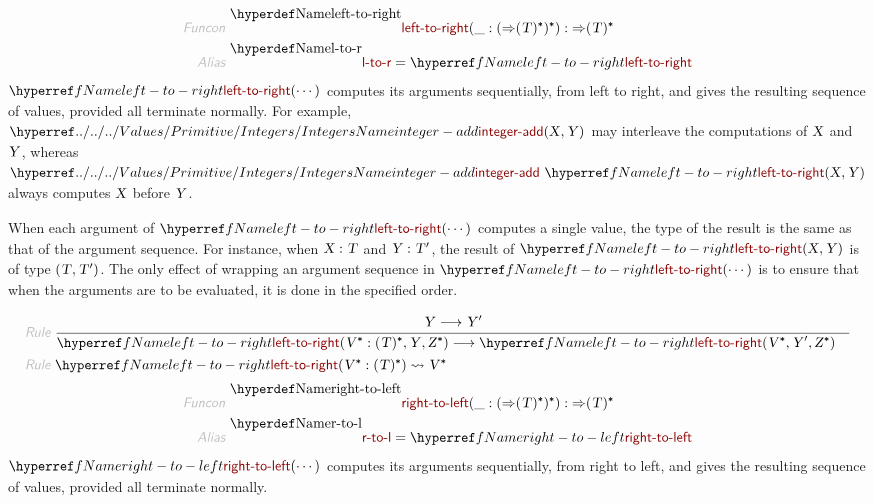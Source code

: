 \begin{align*}
  \KEY{Funcon} ~ 
  & \NAMEDECL{left-to-right}(\_ : (  \TO ( \VAR{T} )\STAR )\STAR) :  \TO ( \VAR{T} )\STAR
\\
  \KEY{Alias} ~ 
  & \NAMEDECL{l-to-r} = \NAMEREF{left-to-right}
\end{align*}
$\SHADE{\NAMEREF{left-to-right}
           ( \cdots )}$ computes its arguments sequentially, from left to right,
  and gives the resulting sequence of values, provided all terminate normally.
  For example, $\SHADE{\NAMEHYPER{../../../Values/Primitive}{Integers}{integer-add}
           ( \VAR{X},   
             \VAR{Y} )}$ may interleave the computations of $\SHADE{\VAR{X}}$ and
  $\SHADE{\VAR{Y}}$, whereas $\SHADE{\NAMEHYPER{../../../Values/Primitive}{Integers}{integer-add} ~
           \NAMEREF{left-to-right}
             ( \VAR{X},    
               \VAR{Y} )}$ always computes $\SHADE{\VAR{X}}$ before $\SHADE{\VAR{Y}}$.

When each argument of $\SHADE{\NAMEREF{left-to-right}
           ( \cdots )}$ computes a single value, the type
  of the result is the same as that of the argument sequence. For instance,
  when $\SHADE{\VAR{X} : \VAR{T}}$ and $\SHADE{\VAR{Y} : \VAR{T}'}$, the result of $\SHADE{\NAMEREF{left-to-right}
           ( \VAR{X},   
             \VAR{Y} )}$ is of type $\SHADE{( \VAR{T},  
           \VAR{T}' )}$.
  The only effect of wrapping an argument sequence in $\SHADE{\NAMEREF{left-to-right}
           ( \cdots )}$ is to
  ensure that when the arguments are to be evaluated, it is done in the
  specified order.

\begin{align*}
  \KEY{Rule} ~ 
    & \RULE{
       \VAR{Y} \TRANS 
        \VAR{Y}'
      }{
      &  \NAMEREF{left-to-right}
                      ( \VAR{V}\STAR : ( \VAR{T} )\STAR,   
                        \VAR{Y},   
                        \VAR{Z}\STAR ) \TRANS 
          \NAMEREF{left-to-right}
            ( \VAR{V}\STAR,   
              \VAR{Y}',   
              \VAR{Z}\STAR )
      }
\\
  \KEY{Rule} ~ 
    & \NAMEREF{left-to-right}
        ( \VAR{V}\STAR : ( \VAR{T} )\STAR ) \leadsto
        \VAR{V}\STAR
\end{align*}
\begin{align*}
  \KEY{Funcon} ~ 
  & \NAMEDECL{right-to-left}(\_ : (  \TO ( \VAR{T} )\STAR )\STAR) :  \TO ( \VAR{T} )\STAR
\\
  \KEY{Alias} ~ 
  & \NAMEDECL{r-to-l} = \NAMEREF{right-to-left}
\end{align*}
$\SHADE{\NAMEREF{right-to-left}
           ( \cdots )}$ computes its arguments sequentially, from right to left,
  and gives the resulting sequence of values, provided all terminate normally.


